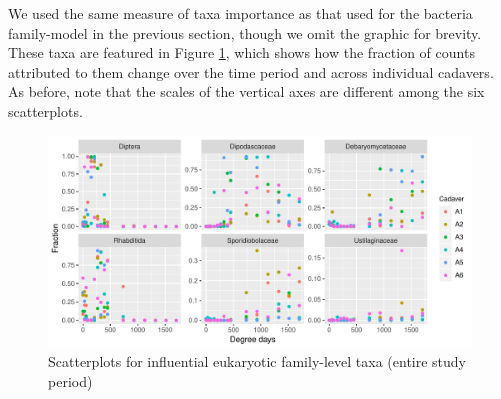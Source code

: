 \documentclass{article}
\begin{document}
We used the same measure of taxa importance as that used for the
bacteria family-model in the previous section, though we omit the
graphic for brevity.  These taxa are featured in Figure
\ref{fig:infl_euk_family_all_data_scatter}, which shows how the
fraction of counts attributed to them change over the time period and
across individual cadavers.  As before, note that the scales of the
vertical axes are different among the six scatterplots.
\begin{figure}
  \centering
  \includegraphics[width=6.5in]{../eukaryote_data/only_families/all_time_steps/hit_1perc_twice/infl_euk_family_all_data_scatter}
  \caption{Scatterplots for influential eukaryotic family-level taxa (entire study period)}
  \label{fig:infl_euk_family_all_data_scatter}
\end{figure}
\end{document}
